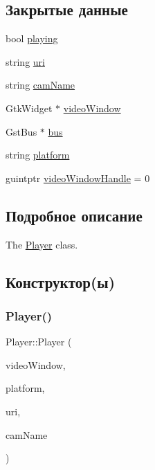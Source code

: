 \subsection*{Закрытые данные}
\begin{DoxyCompactItemize}
\item 
bool \hyperlink{class_player_a93eaebe50e6ab8a19c35138b4c60f60c}{playing}
\item 
string \hyperlink{class_player_a02eaaec54dce5238f76ef6b9f458c86d}{uri}
\item 
string \hyperlink{class_player_af5647b79bedfd422ca8758c90c6bbc45}{cam\+Name}
\item 
Gtk\+Widget $\ast$ \hyperlink{class_player_ae5ed3420e43869788a3e9bf4eb29e529}{video\+Window}
\item 
Gst\+Bus $\ast$ \hyperlink{class_player_a746993d3cf67692b460334b0e0ede459}{bus}
\item 
string \hyperlink{class_player_a4335f10f38749272bbdee425e8e30388}{platform}
\item 
guintptr \hyperlink{class_player_a6375b319e5ba03a025aea4a91f36f7eb}{video\+Window\+Handle} = 0
\end{DoxyCompactItemize}


\subsection{Подробное описание}
The \hyperlink{class_player}{Player} class. 

\subsection{Конструктор(ы)}
\mbox{\label{class_player_a0e17f3ec3397aa056d2ee88a060a7d36}} 
\subsubsection{\texorpdfstring{Player()}{Player()}\hspace{0.1cm}{\footnotesize\ttfamily [1/2]}}
{\footnotesize\ttfamily Player\+::\+Player (\begin{DoxyParamCaption}\item[{Gtk\+Widget $\ast$}]{video\+Window,  }\item[{string}]{platform,  }\item[{string}]{uri,  }\item[{string}]{cam\+Name }\end{DoxyParamCaption})}

